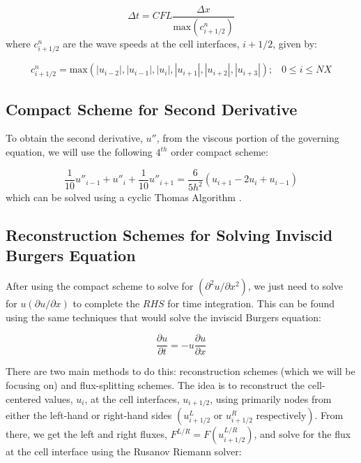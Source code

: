 \documentclass[conf]{new-aiaa}
\begin{document}
\begin{equation}
	\Delta t = \textit{CFL}
	\frac{\Delta x}{\text{max} \left(c_{i+1/2}^n \right)}
\end{equation}
where $c_{i+1/2}^n$ are the wave speeds at the cell interfaces, $i+1/2$, given
by:

\begin{equation}
	c_{i+1/2}^n = \text{max} \left( |u_{i-2}|, |u_{i-1}|, |u_i|, |u_{i+1}|,
	                                |u_{i+2}|, |u_{i+3}| \right)
	\text{;} \quad
	0 \le i \le NX
\end{equation}

\subsection{Compact Scheme for Second Derivative}

To obtain the second derivative, $u''$, from the viscous portion of the
governing equation, we will use the following $4^{th}$ order compact scheme:

\begin{equation}
	\frac{1}{10} u''_{i-1} + u''_i + \frac{1}{10} u''_{i+1} =
	\frac{6}{5h^2} \left( u_{i+1} - 2u_i + u_{i-1} \right)
\end{equation}
which can be solved using a cyclic Thomas Algorithm \cite{shanbhag_2014}.

\subsection{Reconstruction Schemes for Solving Inviscid Burgers Equation}
After using the compact scheme to solve for $(\partial^2 u / \partial x^2)$, we
just need to solve for $u (\partial u / \partial x)$ to complete the $RHS$ for
time integration. This can be found using the same techniques that would solve
the inviscid Burgers equation:

\begin{equation}
	\frac{\partial u}{\partial t} = -u \frac{\partial u}{\partial x}
\end{equation}

There are two main methods to do this: reconstruction schemes (which we will be
focusing on) and flux-splitting schemes. The idea is to reconstruct the
cell-centered values, $u_i$, at the cell interfaces, $u_{i+1/2}$, using
primarily nodes from either the left-hand or right-hand sides $\left(
u_{i+1/2}^L \text{ or } u_{i+1/2}^R \text{ respectively} \right)$. From there, we
get the left and right fluxes, $F^{L/R}=F \left(u_{i+1/2}^{L/R} \right)$, and
solve for the flux at the cell interface using the Rusanov Riemann solver:
\end{document}
